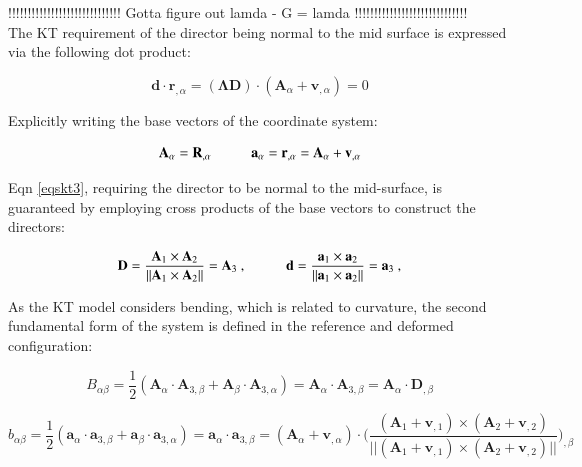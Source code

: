 !!!!!!!!!!!!!!!!!!!!!!!!!!!!!
Gotta figure out lamda - G = lamda
!!!!!!!!!!!!!!!!!!!!!!!!!!!!! \\

The KT requirement of the director being normal to the mid surface is expressed via the following dot product:

\begin{equation} 
\mathbf{d} \cdot \mathbf{r}_{,\alpha}
=
(\boldsymbol{\Lambda} \mathbf{D}) \cdot (\mathbf{A}_\alpha + \mathbf{v}_{,\alpha})
=
0
\label{eqskt3}
\end{equation}

Explicitly writing the base vectors of the coordinate system:

\begin{equation} 
\mathbf{A}_\alpha  = \mathbf{R}_{,\alpha}
\hspace{10mm}
\mathbf{a}_\alpha  = \mathbf{r}_{,\alpha} = \mathbf{A}_\alpha + \mathbf{v}_{,\alpha}
\label{eqskt4}
\end{equation}

Eqn \eqref{eqskt3}, requiring the director to be normal to the mid-surface, is guaranteed by employing cross products of the base vectors to construct the directors:

\begin{equation} 
\mathbf{D} = \frac{\mathbf{A}_1 \times \mathbf{A}_2}
{\lvert \lvert \mathbf{A}_1 \times \mathbf{A}_2 \rvert \rvert}
= \mathbf{A}_3\ ,
\hspace{10mm}
\mathbf{d} = \frac{\mathbf{a}_1 \times \mathbf{a}_2}
{\lvert \lvert \mathbf{a}_1 \times \mathbf{a}_2 \rvert \rvert}
= \mathbf{a}_3\ ,
\label{eqskt5}
\end{equation}

As the KT model considers bending, which is related to curvature, the second fundamental form of the system is defined in the reference and deformed configuration:

\begin{equation} 
B_{\alpha \beta} = \frac{1}{2} 
( 
\mathbf{A}_\alpha \cdot \mathbf{A}_{3,\beta} 
+
\mathbf{A}_\beta \cdot \mathbf{A}_{3,\alpha}
)
=
\mathbf{A}_\alpha \cdot \mathbf{A}_{3,\beta}
=
\mathbf{A}_\alpha \cdot \mathbf{D}_{,\beta}
\label{eqskt6}
\end{equation}

\begin{equation} 
b_{\alpha \beta} = \frac{1}{2} 
( 
\mathbf{a}_\alpha \cdot \mathbf{a}_{3,\beta} 
+
\mathbf{a}_\beta \cdot \mathbf{a}_{3,\alpha}
)
=
\mathbf{a}_\alpha \cdot \mathbf{a}_{3,\beta}
=
(\mathbf{A}_\alpha + \mathbf{v}_{,\alpha}) 
\cdot 
\Bigg({
	\frac{    (\mathbf{A}_1 + \mathbf{v}_{,1})  \times (\mathbf{A}_2 + \mathbf{v}_{,2})    }
	{\lvert \lvert  (\mathbf{A}_1 + \mathbf{v}_{,1})  \times (\mathbf{A}_2 + \mathbf{v}_{,2})   \rvert \rvert}
}\Bigg)_{,\beta}
\label{eqskt7}
\end{equation}

